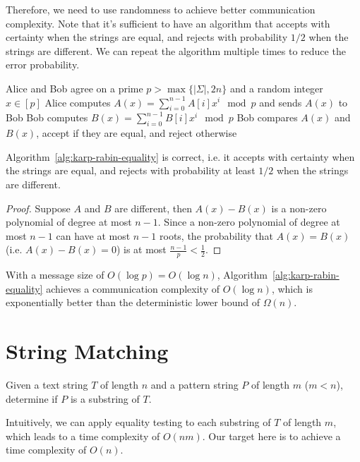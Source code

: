 Therefore, we need to use randomness to achieve better communication complexity. Note that it's sufficient to have an algorithm that accepts with certainty when the strings are equal, and rejects with probability $1/2$ when the strings are different. We can repeat the algorithm multiple times to reduce the error probability.

\begin{algorithm}[H]
	Alice and Bob agree on a prime $p>\max\{|\Sigma|, 2n\}$ and a random integer $x \in [p]$\;
	Alice computes $A(x) = \sum_{i=0}^{n-1} A[i] x^i \mod p$ and sends $A(x)$ to Bob\;
	Bob computes $B(x) = \sum_{i=0}^{n-1} B[i] x^i \mod p$\;
	Bob compares $A(x)$ and $B(x)$, accept if they are equal, and reject otherwise\;
	\caption{Karp-Rabin Algorithm for Equality Testing} \label{alg:karp-rabin-equality}
\end{algorithm}

\begin{theorem}
	Algorithm~\ref{alg:karp-rabin-equality} is correct, i.e. it accepts with certainty when the strings are equal, and rejects with probability at least $1/2$ when the strings are different.
\end{theorem}
\begin{proof}
	Suppose $A$ and $B$ are different, then $A(x) - B(x)$ is a non-zero polynomial of degree at most $n-1$. Since a non-zero polynomial of degree at most $n-1$ can have at most $n-1$ roots, the probability that $A(x) = B(x)$ (i.e. $A(x) - B(x) = 0$) is at most $\frac{n-1}{p} < \frac{1}{2}$.
\end{proof}

With a message size of $O(\log p) = O(\log n)$, Algorithm~\ref{alg:karp-rabin-equality} achieves a communication complexity of $O(\log n)$, which is exponentially better than the deterministic lower bound of $\Omega(n)$.

\section{String Matching}

\begin{problem}
Given a text string $T$ of length $n$ and a pattern string $P$ of length $m$ ($m<n$), determine if $P$ is a substring of $T$.
\end{problem}

Intuitively, we can apply equality testing to each substring of $T$ of length $m$, which leads to a time complexity of $O(nm)$. Our target here is to achieve a time complexity of $O(n)$.

